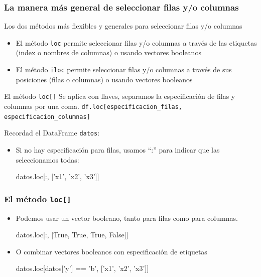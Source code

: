 \documentclass[9pt]{beamer}
\begin{document}
\begin{frame}[fragile]
  \frametitle{La manera más general de seleccionar filas y/o columnas}
  \begin{block}{Los dos métodos  más flexibles y generales para seleccionar filas y/o columnas}
    \begin{itemize}
    \item
      El método {\tt loc} permite seleccionar filas y/o columnas a través de las etiquetas (index o nombres de columnas) o usando vectores booleanos
    \item El método {\tt iloc} permite seleccionar filas y/o columnas a través de sus posiciones (filas o columnas) o usando vectores booleanos
    \end{itemize}
  \end{block}

\end{frame}
\begin{frame}[fragile]
  
  \begin{block}{El método {\tt loc[]}}
    Se aplica con llaves, separamos la especificación de filas y columnas por una coma. {\tt df.loc[especificacion\_filas, especificacion\_columnas]}
  \end{block}

  \pause
  Recordad el DataFrame {\tt datos}:\smallskip

  
\begin{itemize}
  \item<3-> Si no hay especificación para filas, usamos ``:'' para indicar que las seleccionamos todas:
    \begin{pyconsole}
datos.loc[:, ['x1', 'x2', 'x3']]
    \end{pyconsole}
\end{itemize}
\end{frame}
\begin{frame}[fragile]
  \frametitle{El método {\tt loc[]}}
 
\begin{itemize}
\item Podemos usar un vector booleano, tanto para filas como para columnas.
      \begin{pyconsole}
datos.loc[:, [True, True, True, False]]
      \end{pyconsole}
    \item<2-> O combinar vectores booleanos con especificación de etiquetas
      \begin{pyconsole}
datos.loc[datos['y'] == 'b', ['x1', 'x2', 'x3']]
      \end{pyconsole}
\end{itemize}
\end{frame}
\end{document}

